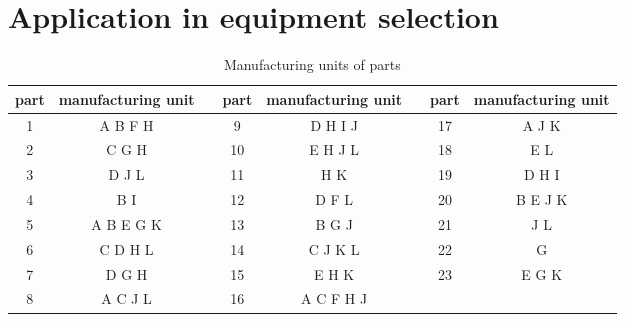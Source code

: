 \section{Application in equipment selection}



\begin{table}[h!]
	\begin{center}
		\caption{Manufacturing units of parts}
		\label{tab:tab4}
		\begin{tabular}{cc|c|cc|c|cc}
			\hline
			part & manufacturing unit && part & manufacturing unit && part & manufacturing unit \\
			\hline
			1 & A B F H   && 9  & D H I J   && 17 & A J K \\
			2 & C G H     && 10 & E H J L   && 18 & E L \\
			3 & D J L     && 11 & H K       && 19 & D H I \\
			4 & B I       && 12 & D F L     && 20 & B E J K \\
			5 & A B E G K && 13 & B G J     && 21 & J L \\
			6 & C D H L   && 14 & C J K L   && 22 & G \\
			7 & D G H     && 15 & E H K     && 23 & E G K \\
			8 & A C J L   && 16 & A C F H J &&    & \\
			\hline
		\end{tabular}
	\end{center}
\end{table}




